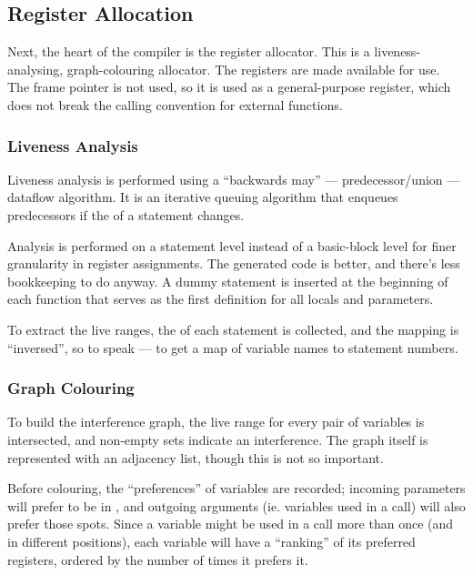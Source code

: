 \documentclass[12pt]{article}
\begin{document}
\subsection{Register Allocation}

Next, the heart of the compiler is the register allocator. This is a liveness-analysing, graph-colouring allocator. The
registers  are made available for use. The frame pointer is not used, so it is used as
a general-purpose register, which does not break the calling convention for external functions.


\subsubsection{Liveness Analysis}

Liveness analysis is performed using a \enquote{backwards may} --- predecessor/union --- dataflow algorithm. It is an
iterative queuing algorithm that enqueues predecessors if the  of a statement changes.

Analysis is performed on a statement level instead of a basic-block level for finer granularity in register assignments.
The generated code is better, and there's less bookkeeping to do anyway. A dummy statement is inserted at the beginning
of each function that serves as the first definition for all locals and parameters.

To extract the live ranges, the  of each statement is collected, and the mapping is \enquote{inversed}, so to
speak --- to get a map of variable names to statement numbers.



\subsubsection{Graph Colouring}

To build the interference graph, the live range for every pair of variables is intersected, and non-empty sets indicate
an interference. The graph itself is represented with an adjacency list, though this is not so important.

Before colouring, the \enquote{preferences} of variables are recorded; incoming parameters will prefer to be in , and
outgoing arguments (ie. variables used in a call) will also prefer those spots. Since a variable might be used in a call
more than once (and in different positions), each variable will have a \enquote{ranking} of its preferred registers, ordered
by the number of times it prefers it.
\end{document}
